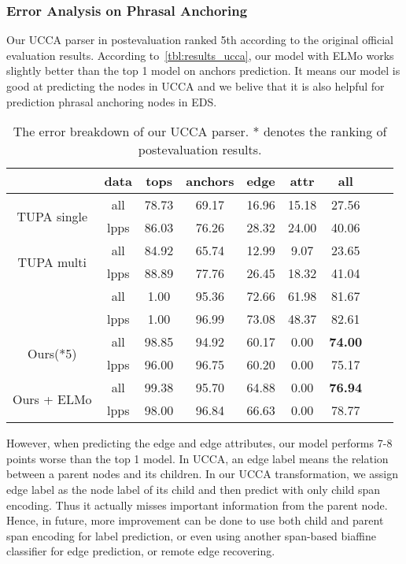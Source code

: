 \subsubsection{Error Analysis on Phrasal Anchoring}
\label{sssec:lex-phr:error-phr}
Our UCCA parser in postevaluation ranked 5th according to the
original official evaluation results. According
to~\autoref{tbl:results_ucca}, our model with ELMo works slightly
better than the top 1 model on anchors prediction. It means our model
is good at predicting the nodes in UCCA and we belive that it is also
helpful for prediction phrasal anchoring nodes in EDS.

\begin{table}[!tbp]
  \caption{\label{tbl:results_ucca} The error breakdown of our UCCA
    parser. * denotes the ranking of postevaluation results.}
\begin{center}
\setlength{\tabcolsep}{3pt}
\begin{tabular}{ccccccccc}
\toprule
\hline
                              & data & tops  & anchors & edge  & attr  & all   \\ \hline
\multirow{2}{*}{ TUPA
single }                      & all  & 78.73 & 69.17   & 16.96 & 15.18 & 27.56 \\
                              & lpps & 86.03 & 76.26   & 28.32 & 24.00 & 40.06 \\
\multirow{2}{*}{ TUPA
multi }                       & all  & 84.92 & 65.74   & 12.99 &  9.07 & 23.65 \\
                              & lpps & 88.89 & 77.76   & 26.45 & 18.32 & 41.04 \\
\multirow{2}{*}{\citet{Che:Dou:Xu:19}}       & all  & 1.00  & 95.36   & 72.66 & 61.98 & 81.67 \\
                              & lpps & 1.00  & 96.99   & 73.08 & 48.37 & 82.61 \\ \hline
\multirow{2}{*}{ Ours(*5)}    & all  & 98.85 & 94.92   & 60.17 & 0.00  & {\bf 74.00} \\
                              & lpps & 96.00 & 96.75   & 60.20 & 0.00  & 75.17 \\
\multirow{2}{*}{ Ours + ELMo} & all  & 99.38 & 95.70   & 64.88 & 0.00  & {\bf 76.94} \\
                              & lpps & 98.00 & 96.84   & 66.63 & 0.00  & 78.77 \\ \hline
\bottomrule
\end{tabular}
\end{center}
\end{table}

However, when predicting the edge and edge attributes, our model
performs 7-8 points worse than the top 1 model. In UCCA, an edge label
means the relation between a parent nodes and its children. In our
UCCA transformation, we assign edge label as the node label of its
child and then predict with only child span encoding. Thus it actually
misses important information from the parent node. Hence, in future,
more improvement can be done to use both child and parent span
encoding for label prediction, or even using another span-based
biaffine classifier for edge prediction, or remote edge recovering.

